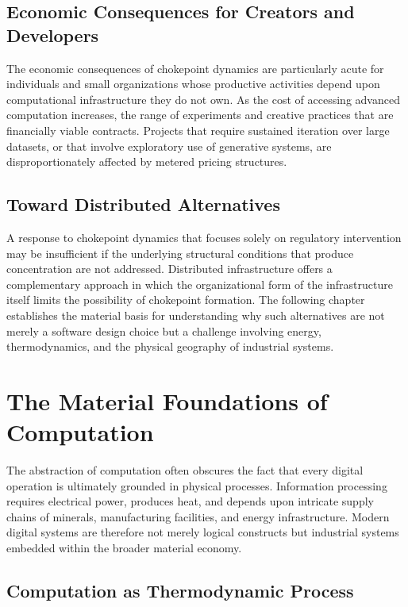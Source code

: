 \documentclass[12pt]{book}
\theoremstyle{definition}
\theoremstyle{remark}
\begin{document}
\section{Economic Consequences for Creators and Developers}

The economic consequences of chokepoint dynamics are particularly
acute for individuals and small organizations whose productive
activities depend upon computational infrastructure they do not own.
As the cost of accessing advanced computation increases, the range of
experiments and creative practices that are financially viable
contracts. Projects that require sustained iteration over large
datasets, or that involve exploratory use of generative systems, are
disproportionately affected by metered pricing structures.

\section{Toward Distributed Alternatives}

A response to chokepoint dynamics that focuses solely on regulatory
intervention may be insufficient if the underlying structural
conditions that produce concentration are not addressed. Distributed
infrastructure offers a complementary approach in which the
organizational form of the infrastructure itself limits the
possibility of chokepoint formation. The following chapter establishes
the material basis for understanding why such alternatives are not
merely a software design choice but a challenge involving energy,
thermodynamics, and the physical geography of industrial systems.

\chapter{The Material Foundations of Computation}

The abstraction of computation often obscures the fact that every
digital operation is ultimately grounded in physical processes.
Information processing requires electrical power, produces heat, and
depends upon intricate supply chains of minerals, manufacturing
facilities, and energy infrastructure. Modern digital systems are
therefore not merely logical constructs but industrial systems
embedded within the broader material economy.

\section{Computation as Thermodynamic Process}
\end{document}
